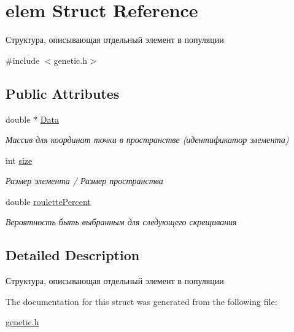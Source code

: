 \hypertarget{structelem}{}\section{elem Struct Reference}
\label{structelem}


Структура, описывающая отдельный элемент в популяции  




{\ttfamily \#include $<$genetic.\+h$>$}

\subsection*{Public Attributes}
\begin{DoxyCompactItemize}
\item 
\mbox{\label{structelem_a110db4a39b1ce57d6b381f8f0d3fcde1}} 
double $\ast$ \mbox{\hyperlink{structelem_a110db4a39b1ce57d6b381f8f0d3fcde1}{Data}}
\begin{DoxyCompactList}\small\item\em Массив для координат точки в пространстве (идентификатор элемента) \end{DoxyCompactList}\item 
\mbox{\label{structelem_aa81f5bcd1c3c74b78baa12713a807f5f}} 
int \mbox{\hyperlink{structelem_aa81f5bcd1c3c74b78baa12713a807f5f}{size}}
\begin{DoxyCompactList}\small\item\em Размер элемента / Размер пространства \end{DoxyCompactList}\item 
\mbox{\label{structelem_a2e7c3868a9a384d693cc9d522172efeb}} 
double \mbox{\hyperlink{structelem_a2e7c3868a9a384d693cc9d522172efeb}{roulette\+Percent}}
\begin{DoxyCompactList}\small\item\em Вероятность быть выбранным для следующего скрещивания \end{DoxyCompactList}\end{DoxyCompactItemize}


\subsection{Detailed Description}
Структура, описывающая отдельный элемент в популяции 

The documentation for this struct was generated from the following file\+:\begin{DoxyCompactItemize}
\item 
\mbox{\hyperlink{genetic_8h}{genetic.\+h}}\end{DoxyCompactItemize}
